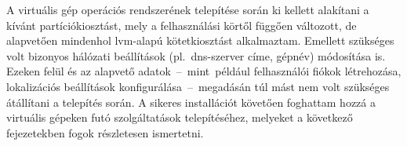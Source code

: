 A virtuális gép operációs rendszerének telepítése során ki kellett alakítani a kívánt partíciókiosztást, mely a felhasználási körtől függően változott, de alapvetően mindenhol \acrshort{lvm}-alapú kötetkiosztást alkalmaztam. Emellett szükséges volt bizonyos hálózati beállítások (pl.~\acrshort{dns}-szerver címe, gépnév) módosítása is. Ezeken felül és az alapvető adatok~--~mint~például felhasználói fiókok létrehozása, lokalizációs beállítások konfigurálása~--~megadásán túl mást nem volt szükséges átállítani a telepítés során. A sikeres installációt követően foghattam hozzá a virtuális gépeken futó szolgáltatások telepítéséhez, melyeket a következő fejezetekben fogok részletesen ismertetni.
